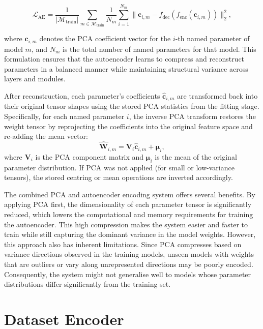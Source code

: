 \begin{equation}
  \mathcal{L}_{\text{AE}} = \frac{1}{|\mathcal{M}_{\text{train}}|} 
\sum_{m \in \mathcal{M}_{\text{train}}} 
\frac{1}{N_m} 
\sum_{i=1}^{N_m} 
\| \mathbf{c}_{i,m} - f_{\text{dec}}(f_{\text{enc}}(\mathbf{c}_{i,m})) \|^2_2,
  \label{eq:pca_ae_loss}
\end{equation}

where $\mathbf{c}_{i,m}$ denotes the PCA coefficient vector for the $i$-th named parameter of model $m$, and $N_m$ is the total number of named parameters for that model. This formulation ensures that the autoencoder learns to compress and reconstruct parameters in a balanced manner while maintaining structural variance across layers and modules.


After reconstruction, each parameter’s coefficients $\hat{\mathbf{c}}_{i,m}$ are transformed back into their original tensor shapes using the stored PCA statistics from the fitting stage. Specifically, for each named parameter $i$, the inverse PCA transform restores the weight tensor by reprojecting the coefficients into the original feature space and re-adding the mean vector:
\[
\hat{\mathbf{W}}_{i,m} = \mathbf{V}_i \hat{\mathbf{c}}_{i,m} + \boldsymbol{\mu}_i,
\]
where $\mathbf{V}_i$ is the PCA component matrix and $\boldsymbol{\mu}_i$ is the mean of the original parameter distribution. If PCA was not applied (for small or low-variance tensors), the stored centring or mean operations are inverted accordingly. 

The combined PCA and autoencoder encoding system offers several benefits. By applying PCA first, the dimensionality of each parameter tensor is significantly reduced, which lowers the computational and memory requirements for training the autoencoder. This high compression makes the system easier and faster to train while still capturing the dominant variance in the model weights. However, this approach also has inherent limitations. Since PCA compresses based on variance directions observed in the training models, unseen models with weights that are outliers or vary along unrepresented directions may be poorly encoded. Consequently, the system might not generalise well to models whose parameter distributions differ significantly from the training set.

\section{Dataset Encoder}
\label{sec:data_enc}

